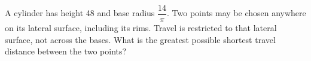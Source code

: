 A cylinder has height 48 and base radius $\dfrac{14}{\pi}$. Two points may be chosen anywhere on its lateral surface, including its rims. Travel is restricted to that lateral surface, not across the bases. What is the greatest possible shortest travel distance between the two points?
